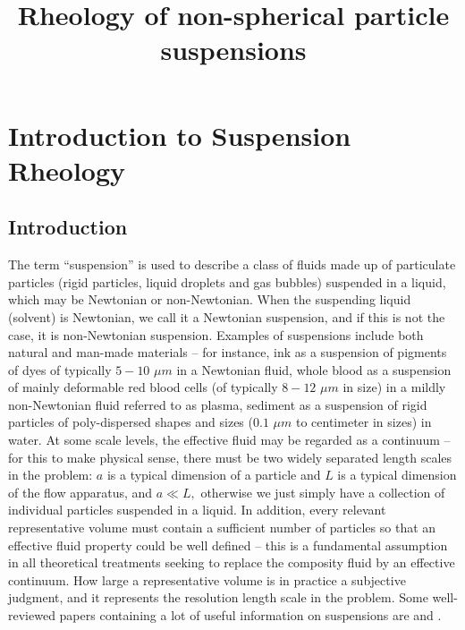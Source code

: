 \documentclass[english,fleqn,allpages]{ISTE_science}[2018/07/30]
\title{Rheology of non-spherical particle suspensions}
\begin{document}
\raggedbottom



\mainmatter
\chapter{Introduction to Suspension Rheology}%
\label{chap-struct}




\section{Introduction}

\label{sec:Introduction}

The term ``suspension'' is used to describe a class of fluids made
up of particulate particles (rigid particles, liquid droplets and
gas bubbles) suspended in a liquid, which may be Newtonian or non-Newtonian.
When the suspending liquid (solvent) is Newtonian, we call it a Newtonian
suspension, and if this is not the case, it is non-Newtonian suspension.
Examples of suspensions include both natural and man-made materials
-- for instance, ink as a suspension of pigments of dyes of typically
$5-10$ $\mu m$ in a Newtonian fluid, whole blood as a suspension
of mainly deformable red blood cells (of typically $8-12$ $\mu m$
in size) in a mildly non-Newtonian fluid referred to as plasma, sediment
as a suspension of rigid particles of poly-dispersed shapes and sizes
($0.1$ $\mu m$ to centimeter in sizes) in water. At some
scale levels, the effective fluid may be regarded as a continuum
-- for this to make physical sense, there must be two widely separated
length scales in the problem: $a$ is a typical dimension of a particle
and $L$ is a typical dimension of the flow apparatus, and $a\ll L,$
otherwise we just simply have a collection of individual particles
suspended in a liquid. In addition, every relevant representative
volume must contain a sufficient number of particles so that an effective
fluid property could be well defined -- this is a fundamental assumption
in all theoretical treatments seeking to replace the composity fluid
by an effective continuum. How large  a representative volume is in
practice a subjective judgment, and it represents the resolution
length scale in the problem. Some well-reviewed papers containing a lot of 
useful information on suspensions are \cite{Gadala80, metzner85}
and \cite{zarraga00}.
\end{document}

